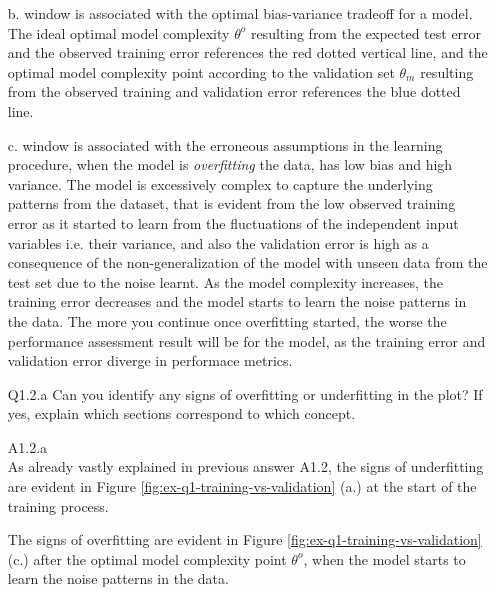 \documentclass[unicode, 11pt, a4paper]{scrartcl}
\begin{document}
\begin{itemize}
\begin{itemize}
		      \item[b.] window is associated with the optimal bias-variance tradeoff for a model.
		            The ideal optimal model complexity $\theta^o$
		            resulting from the expected test error and the observed training error
		            references the red dotted vertical line,
		            and the optimal model complexity point according to the validation set $\theta_m$
		            resulting from the observed training and validation error
		            references the blue dotted line.

		      \item[c.] window is associated with the erroneous assumptions in the learning procedure,
		            when the model is \textit{overfitting} the data, has low bias and high variance.
		            The model is excessively complex to capture the underlying patterns from the dataset,
		            that is evident from the low observed training error as it started to learn
		            from the fluctuations of the independent input variables i.e. their variance,
		            and also the validation error is high as a consequence of the non-generalization
		            of the model with unseen data from the test set due to the noise learnt.
		            As the model complexity increases, the training error decreases
		            and the model starts to learn the noise patterns in the data.
		            The more you continue once overfitting started, the worse the performance assessment
		            result will be for the model, as the training error and validation error diverge
		            in performace metrics.
	      \end{itemize}

	      \begin{itemize}
		      \item[Q1.2.a] Can you identify any signs of overfitting or underfitting in the plot?
		            If yes, explain which sections correspond to which concept.

		      \item[A1.2.a] ~\\
		            As already vastly explained in previous answer A1.2,
		            the signs of underfitting are evident in Figure \ref{fig:ex-q1-training-vs-validation}
		            (a.) at the start of the training process.

		            The signs of overfitting are evident in Figure \ref{fig:ex-q1-training-vs-validation}
		            (c.) after the optimal model complexity point $\theta^o$,
		            when the model starts to learn the noise patterns in the data.


\end{itemize}
\end{itemize}
\end{document}
